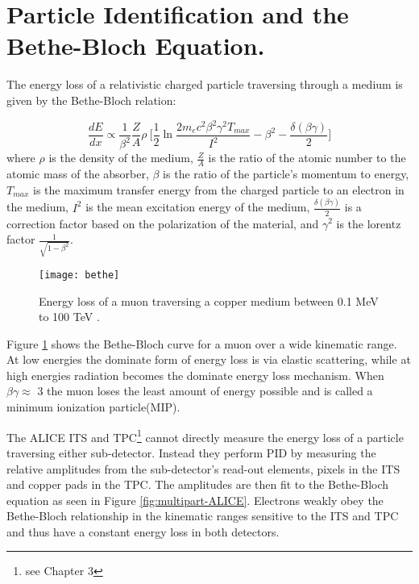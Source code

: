 \section{Particle Identification and the Bethe-Bloch Equation.}\label{ref:pid}


The energy loss of a relativistic charged particle traversing through a medium is given by the Bethe-Bloch relation:

\begin{equation}
\frac{dE}{dx} \propto \frac{1}{\beta^{2}} \frac{Z}{A} \rho \  \bigg[ \frac{1}{2} \ln \frac{2 m_{e} c^{2} \beta^{2} \gamma^{2} T_{max}}{I^{2}} - \beta^{2} - \frac{\delta \left( \beta \gamma \right) }{2} \bigg]
\end{equation}
\noindent
where $\rho$ is the density of the medium, $\frac{Z}{A}$ is the ratio of the atomic number to the atomic mass of the absorber, $\beta$ is the ratio of the particle's momentum to energy, $T_{max}$ is the maximum transfer energy from the charged particle to an electron in the medium,  $I^{2}$ is the mean excitation energy of the medium, $\frac{\delta \left( \beta \gamma \right) }{2}$ is a correction factor based on the polarization of the material, and $\gamma^{2}$ is the lorentz factor $\frac{1}{\sqrt{1-\beta^{2}}}$.

\begin{figure}[t!]
\texttt{[image: bethe]}
\centering
\caption{ Energy loss of a muon traversing a copper medium between 0.1 MeV to 100 TeV \cite{Patrignani:2016xqp}.}
\label{fig:rawBB}
\end{figure}

Figure \ref{fig:rawBB} shows the Bethe-Bloch curve for a muon over a wide kinematic range.  At low energies the dominate form of energy loss is via elastic scattering, while at high energies radiation becomes the dominate energy loss mechanism. When $\beta \gamma \approx$ 3 the muon loses the least amount of energy possible and is called a minimum ionization particle(MIP).  

The ALICE ITS and TPC\footnote{see Chapter 3} cannot directly measure the energy loss of a particle traversing either sub-detector.  Instead they perform PID by measuring the relative amplitudes from the sub-detector's read-out elements, pixels in the ITS and copper pads in the TPC.  The amplitudes are then fit to the Bethe-Bloch equation as seen in Figure \ref{fig:multipart-ALICE}.  Electrons weakly obey the Bethe-Bloch relationship in the kinematic ranges sensitive to the ITS and TPC and thus have a constant energy loss in both detectors.

